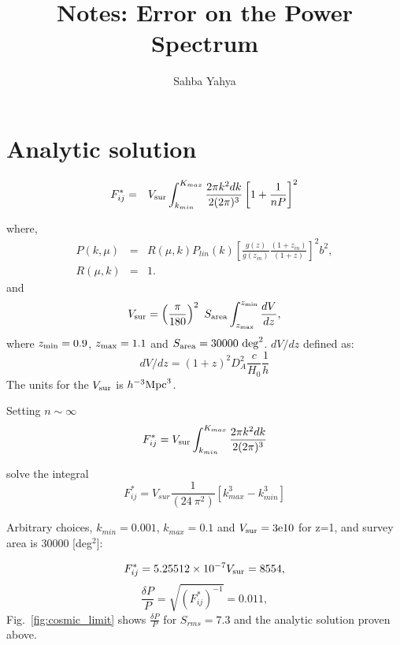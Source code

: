 \documentclass[10pt,a4paper]{article}
\title{Notes: Error on the Power Spectrum}
\author{Sahba Yahya}
\begin{document}
\maketitle


\section{Analytic solution }
\begin{eqnarray}\label{FIJ_DEV}
F_{ij}^*&=& V_{\rm sur} \int_{k_{min}}^{K_{max}} \frac{ 2 \pi k^2 dk}{2 (2 \pi)^3} \left[1+\frac{1}{nP}\right]^2
\end{eqnarray}

where,
\begin{eqnarray}
P(k,\mu)&=& R(\mu,k)P_{lin}(k) \left[\frac{g(z)}{g(z_{in})} \frac{(1+z_{in})}{(1+z)}\right]^2 b^2,\\
R(\mu,k)& =&1.\label{eq:Rsig}
\end{eqnarray}
and
\begin{equation}\label{Vsurvey}
V_{\rm sur} = \left(\frac{\pi}{180}\right)^2 \ S_{\rm area}\int^{z_{\rm min}}_{z_{\rm max}} \frac{dV}{dz}, 
\end{equation}
where $z_{\rm min} = 0. 9 $,  $z_{\rm max} = 1.1 $ and $S_{\rm area} = 30000 \  {\rm deg}^2$. $dV/dz$ defined as:\[dV/dz=  (1+z)^2D_A^2 \frac{c }{H_0} \frac{1}{h}\]
The units for the $V_{\rm sur}$ is $h^{-3} {\rm Mpc}^3$.

Setting $ n \sim \infty$ 
\begin{equation}
F_{ij}^*= V_{\rm sur} \int_{k_{min}}^{K_{max}}  \frac{ 2 \pi k^2 dk}{2 (2 \pi)^3}
\end{equation}

solve the integral 
\begin{equation}\label{dp_ov_p}
F_{ij}^*= V_{sur} \frac{1}{ (24 \ \pi^2 )} \left[ k_{max}^3 -k_{min} ^3 \right]
\end{equation}

Arbitrary choices, $k_{min} = 0.001$, $k_{max} = 0.1$ and $V_{\rm sur} = 3{\rm e}10$ for z=1, and survey area is 30000 [deg$^2$]:

\begin{equation}
F_{ij}^* = 5.25512 \times 10^{-7}  V_{\rm sur}   = 8554,
\end{equation}
\begin{equation}
\frac{\delta P}{P} = \sqrt{(F_{ij}^*)^{-1}} = 0.011,
\end{equation}
Fig.~\ref{fig:cosmic_limit} shows $\frac{\delta P}{P}$ for $S_{rms} = 7.3$ and  the analytic solution proven above.
\end{document}
